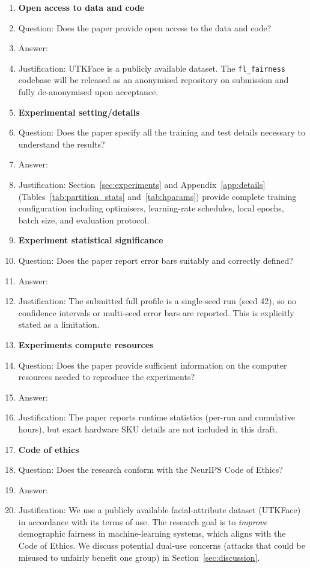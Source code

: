 \begin{enumerate}
\item {\bf Open access to data and code}
    \item[] Question: Does the paper provide open access to the data and code?
    \item[] Answer: \answerYes{}
    \item[] Justification: UTKFace is a publicly available dataset. The \texttt{fl\_fairness} codebase will be released as an anonymised repository on submission and fully de-anonymised upon acceptance.

\item {\bf Experimental setting/details}
    \item[] Question: Does the paper specify all the training and test details necessary to understand the results?
    \item[] Answer: \answerYes{}
    \item[] Justification: Section~\ref{sec:experiments} and Appendix~\ref{app:details} (Tables~\ref{tab:partition_stats} and~\ref{tab:hparams}) provide complete training configuration including optimisers, learning-rate schedules, local epochs, batch size, and evaluation protocol.

\item {\bf Experiment statistical significance}
    \item[] Question: Does the paper report error bars suitably and correctly defined?
    \item[] Answer: \answerNo{}
    \item[] Justification: The submitted full profile is a single-seed run (seed 42), so no confidence intervals or multi-seed error bars are reported. This is explicitly stated as a limitation.

\item {\bf Experiments compute resources}
    \item[] Question: Does the paper provide sufficient information on the computer resources needed to reproduce the experiments?
    \item[] Answer: \answerNo{}
    \item[] Justification: The paper reports runtime statistics (per-run and cumulative hours), but exact hardware SKU details are not included in this draft.

\item {\bf Code of ethics}
    \item[] Question: Does the research conform with the NeurIPS Code of Ethics?
    \item[] Answer: \answerYes{}
    \item[] Justification: We use a publicly available facial-attribute dataset (UTKFace) in accordance with its terms of use. The research goal is to \emph{improve} demographic fairness in machine-learning systems, which aligns with the Code of Ethics. We discuss potential dual-use concerns (attacks that could be misused to unfairly benefit one group) in Section~\ref{sec:discussion}.


\end{enumerate}
